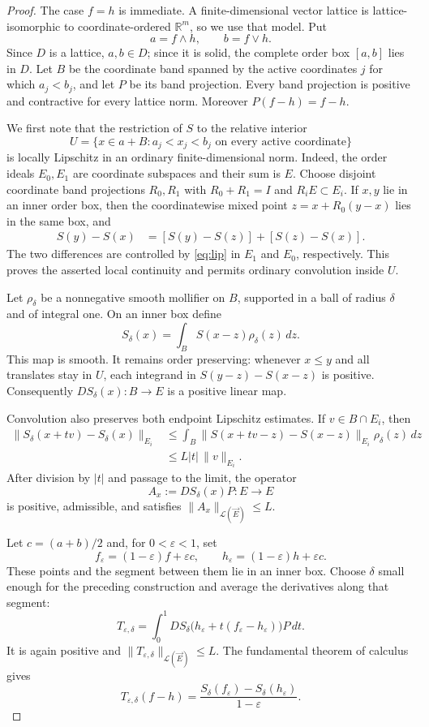 \documentclass[11pt]{article}
\newcommand{\cL}{\mathcal L}
\begin{document}
\begin{proof}
The case $f=h$ is immediate.  A finite-dimensional vector lattice is
lattice-isomorphic to coordinate-ordered $\mathbb R^m$, so we use that model.
Put
\[
 a=f\wedge h,\qquad b=f\vee h.
\]
Since $D$ is a lattice, $a,b\in D$; since it is solid, the complete order box
$[a,b]$ lies in $D$.  Let $B$ be the coordinate band spanned by the active
coordinates $j$ for which $a_j<b_j$, and let $P$ be its band projection.
Every band projection is positive and contractive for every lattice norm.
Moreover $P(f-h)=f-h$.

We first note that the restriction of $S$ to the relative interior
\[
 U=\{x\in a+B: a_j<x_j<b_j\text{ on every active coordinate}\}
\]
is locally Lipschitz in an ordinary finite-dimensional norm.  Indeed, the
order ideals $E_0,E_1$ are coordinate subspaces and their sum is $E$.
Choose disjoint coordinate band projections $R_0,R_1$ with
$R_0+R_1=I$ and $R_iE\subset E_i$.  If $x,y$ lie in an inner order box, then
the coordinatewise mixed point $z=x+R_0(y-x)$ lies in the same box, and
\begin{align*}
 S(y)-S(x)&=[S(y)-S(z)]+[S(z)-S(x)].
\end{align*}
The two differences are controlled by \eqref{eq:lip} in $E_1$ and $E_0$,
respectively.  This proves the asserted local continuity and permits
ordinary convolution inside $U$.

Let $\rho_\delta$ be a nonnegative smooth mollifier on $B$, supported in a
ball of radius $\delta$ and of integral one.  On an inner box define
\[
 S_\delta(x)=\int_B S(x-z)\rho_\delta(z)\,dz.
\]
This map is smooth.  It remains order preserving: whenever $x\le y$ and all
translates stay in $U$, each integrand in
$S(y-z)-S(x-z)$ is positive.  Consequently
$DS_\delta(x):B\to E$ is a positive linear map.

Convolution also preserves both endpoint Lipschitz estimates.  If
$v\in B\cap E_i$, then
\begin{align*}
 \|S_\delta(x+tv)-S_\delta(x)\|_{E_i}
 &\le \int_B
 \|S(x+tv-z)-S(x-z)\|_{E_i}\rho_\delta(z)\,dz\\
 &\le L|t|\,\|v\|_{E_i}.
\end{align*}
After division by $|t|$ and passage to the limit, the operator
\[
 A_x:=DS_\delta(x)P:E\to E
\]
is positive, admissible, and satisfies
$\|A_x\|_{\cL(\vec E)}\le L$.

Let $c=(a+b)/2$ and, for $0<\varepsilon<1$, set
\[
 f_\varepsilon=(1-\varepsilon)f+\varepsilon c,
 \qquad
 h_\varepsilon=(1-\varepsilon)h+\varepsilon c.
\]
These points and the segment between them lie in an inner box.  Choose
$\delta$ small enough for the preceding construction and average the
derivatives along that segment:
\[
 T_{\varepsilon,\delta}
 =\int_0^1
 DS_\delta\bigl(h_\varepsilon+t(f_\varepsilon-h_\varepsilon)\bigr)P\,dt.
\]
It is again positive and
$\|T_{\varepsilon,\delta}\|_{\cL(\vec E)}\le L$.  The fundamental theorem
of calculus gives
\begin{equation}\label{eq:approx}
 T_{\varepsilon,\delta}(f-h)
 =\frac{S_\delta(f_\varepsilon)-S_\delta(h_\varepsilon)}{1-\varepsilon}.
\end{equation}


\end{proof}
\end{document}

